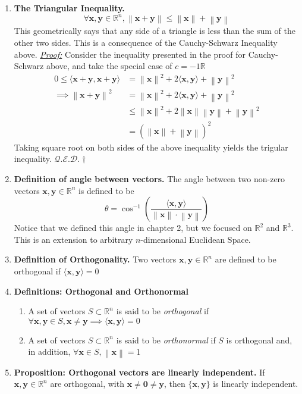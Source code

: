 \documentclass[oneside, 12pt]{book}
\newcommand{\settag}[1]{\renewcommand{\theenumi}{#1}}
\newcommand{\R}{\mathbb{R}}
\newcommand{\qed}{\hfill $\mathcal{Q}.\mathcal{E}.\mathcal{D}.\dagger$}
\newcommand{\tbf}[1]{\textbf{#1}}
\newcommand{\tit}[1]{\textit{#1}}
\newcommand{\proof}{\tit{\underline{Proof:}}} %
\newcommand{\norm}[1]{\left\lVert#1\right\rVert}
\newcommand{\para}[1]{\item \tbf{#1}}
\newcommand{\vx}{\mathbf{x}}
\newcommand{\vy}{\mathbf{y}}
\newcommand{\vzero}{\mathbf{0}}
\begin{document}
\begin{enumerate}
    \settag{4.3.4-(2)}
    \para{The Triangular Inequality.}
    \begin{equation*}
        \forall \vx, \vy \in \R^n, \norm{\vx + \vy}\leq \norm{\vx} + \norm{\vy}
    \end{equation*}
    This geometrically says that any side of a triangle is less than the sum of the other 
    two sides. This is a consequence of the Cauchy-Schwarz Inequality above.\newline
    \proof \newline
    Consider the inequality presented in the proof for Cauchy-Schwarz above, and take the special
    case of $c = -1\R$
    \begin{align*}
        0 \leq \langle \vx + \vy,\vx+\vy \rangle &= \norm{\vx}^2 + 2\langle \vx,\vy\rangle + \norm{\vy}^2 \\
        \implies \norm{\vx+\vy}^2 &= \norm{\vx}^2 + 2\langle \vx,\vy\rangle + \norm{\vy}^2 \\
        &\leq \norm{\vx}^2 + 2\norm{\vx}\norm{\vy} + \norm{\vy}^2 \\
        &= \left(\norm{\vx} +\norm{\vy}\right)^2
    \end{align*}
    Taking square root on both sides of the above inequality yields the trigular inequality. \qed
    
    \settag{4.3.5}
    \para{Definition of angle between vectors.} The angle between two non-zero vectors 
    $\vx,\vy \in \R^n$ is defined to be
    \begin{equation*}
        \theta = \cos^{-1}\left(\frac{\langle\vx,\vy\rangle}{\norm{\vx} \cdot \norm{\vy}}\right)
    \end{equation*}
    Notice that we defined this angle in chapter 2, but we focused on $\R^2$ and $\R^3$. 
    This is an extension to arbitrary $n$-dimensional Euclidean Space.
    
    \settag{4.3.7}
    \para{Definition of Orthogonality.} Two vectors $\vx,\vy \in \R^n$ are defined to be 
    orthogonal if $\langle \vx,\vy\rangle = 0$
    
    \settag{4.3.9}
    \para{Definitions: Orthogonal and Orthonormal}
    \begin{enumerate}
        \item A set of vectors $S\subset \R^n$ is said to be \tit{orthogonal} if $\forall 
        \vx,\vy \in S, \vx \neq \vy \implies \langle \vx,\vy\rangle = 0$
        \item A set of vectors $S\subset \R^n$ is said to be \tit{orthonormal} if $S$ 
        is orthogonal and, in addition, $\forall \vx \in S, \norm{\vx} = 1$
    \end{enumerate}
    
    \settag{4.3.10}
    \para{Proposition: Orthogonal vectors are linearly independent.} If $\vx,\vy \in \R^n$ 
    are orthogonal, with $\vx \neq \vzero \neq \vy$, then $\{\vx,\vy\}$ is linearly independent.

\end{enumerate}
\end{document}
